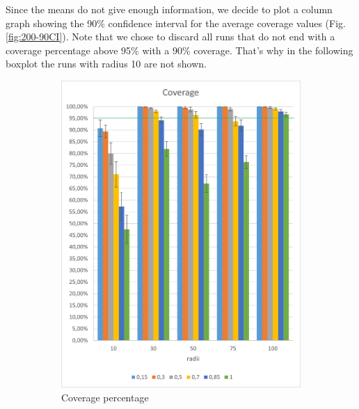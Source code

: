 Since the means do not give enough information, we decide to plot a column graph showing the 90\% confidence interval for the average coverage values (Fig. \ref{fig:200-90CI}). Note that we chose to discard all runs that do not end with a coverage percentage above 95\% with a 90\% coverage. That's why in the following boxplot the runs with radius 10 are not shown.

\begin{figure}[h!]
\centering
\begin{subfigure}{.5\textwidth}
  \centering
  \includegraphics[width=1\linewidth]{./images/200coverageCI.png}
  \caption{Coverage percentage}
  \label{fig:sub1}
\end{subfigure}%
\begin{subfigure}{.5\textwidth}
  \centering

\end{subfigure}
\end{figure}
